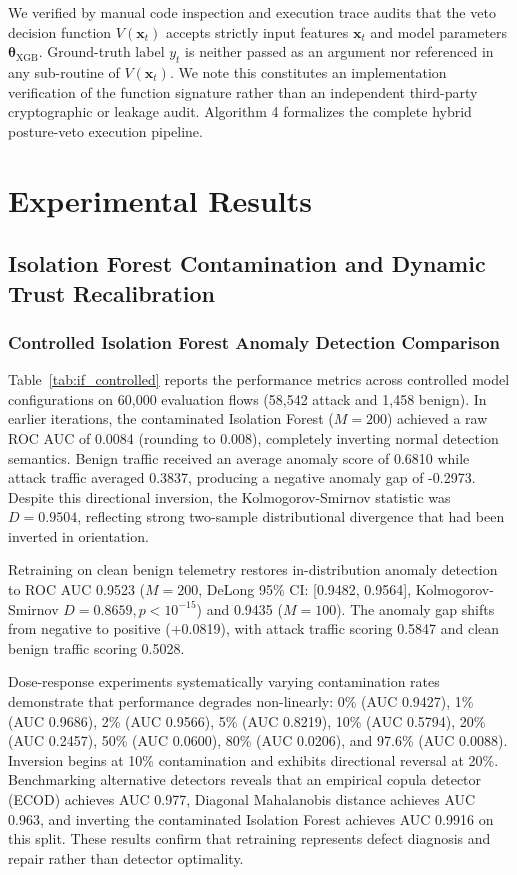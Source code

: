 \documentclass[journal,10pt,onecolumn]{IEEEtran}
\begin{document}
We verified by manual code inspection and execution trace audits that the veto decision function $V(\mathbf{x}_t)$ accepts strictly input features $\mathbf{x}_t$ and model parameters $\boldsymbol{\theta}_{\text{XGB}}$. Ground-truth label $y_t$ is neither passed as an argument nor referenced in any sub-routine of $V(\mathbf{x}_t)$. We note this constitutes an implementation verification of the function signature rather than an independent third-party cryptographic or leakage audit. Algorithm 4 formalizes the complete hybrid posture-veto execution pipeline.

\section{Experimental Results}\label{sec:results}

\subsection{Isolation Forest Contamination and Dynamic Trust Recalibration}

\subsubsection{Controlled Isolation Forest Anomaly Detection Comparison}
Table~\ref{tab:if_controlled} reports the performance metrics across controlled model configurations on 60,000 evaluation flows (58,542 attack and 1,458 benign). In earlier iterations, the contaminated Isolation Forest ($M=200$) achieved a raw ROC AUC of 0.0084 (rounding to 0.008), completely inverting normal detection semantics. Benign traffic received an average anomaly score of 0.6810 while attack traffic averaged 0.3837, producing a negative anomaly gap of -0.2973. Despite this directional inversion, the Kolmogorov-Smirnov statistic was $D = 0.9504$, reflecting strong two-sample distributional divergence that had been inverted in orientation.

Retraining on clean benign telemetry restores in-distribution anomaly detection to ROC AUC 0.9523 ($M=200$, DeLong 95\% CI: [0.9482, 0.9564], Kolmogorov-Smirnov $D = 0.8659, p < 10^{-15}$) and 0.9435 ($M=100$). The anomaly gap shifts from negative to positive (+0.0819), with attack traffic scoring 0.5847 and clean benign traffic scoring 0.5028.

Dose-response experiments systematically varying contamination rates demonstrate that performance degrades non-linearly: 0\% (AUC 0.9427), 1\% (AUC 0.9686), 2\% (AUC 0.9566), 5\% (AUC 0.8219), 10\% (AUC 0.5794), 20\% (AUC 0.2457), 50\% (AUC 0.0600), 80\% (AUC 0.0206), and 97.6\% (AUC 0.0088). Inversion begins at 10\% contamination and exhibits directional reversal at 20\%. Benchmarking alternative detectors reveals that an empirical copula detector (ECOD) achieves AUC 0.977, Diagonal Mahalanobis distance achieves AUC 0.963, and inverting the contaminated Isolation Forest achieves AUC 0.9916 on this split. These results confirm that retraining represents defect diagnosis and repair rather than detector optimality.
\end{document}
